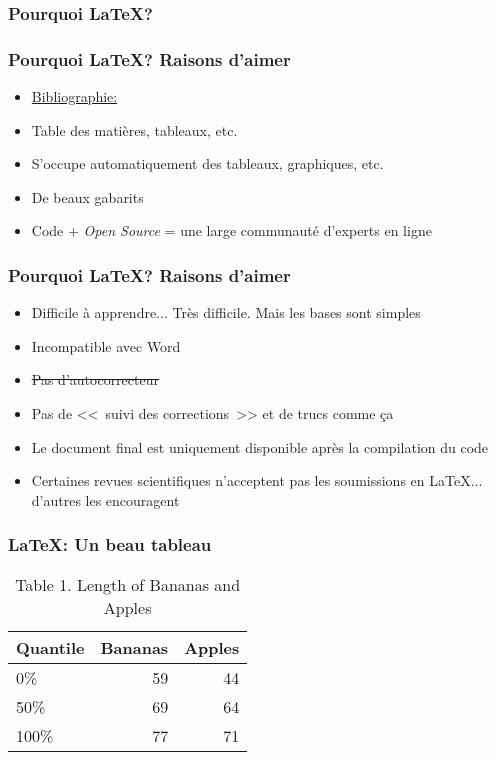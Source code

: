 \documentclass{beamer}
\begin{document}
    \begin{frame}
        \frametitle{Pourquoi \LaTeX?} \vspace{1cm}   
    \end{frame}
    
    \begin{frame}
        \frametitle{Pourquoi \LaTeX? Raisons d'aimer} \vspace{1cm}
        \begin{itemize}
           \item{\href{https://scholar.google.ca}{Bibliographie: \BibTeX}}
           \item{Table des matières, tableaux, etc.}
           \item{S'occupe automatiquement des tableaux, graphiques, etc.}
           \item{De beaux gabarits}
           \item{Code + \emph{Open Source} = une large communauté d'experts en ligne}
        \end{itemize} 
    \end{frame}
    
    \begin{frame}
        \frametitle{Pourquoi \LaTeX? Raisons d'aimer} \vspace{1cm}
        \begin{itemize}
           \item{Difficile à apprendre... Très difficile. Mais les bases sont simples}
           \item{Incompatible avec Word}
           \item{\sout{Pas d'autocorrecteur}}
           \item{Pas de <<~suivi des corrections~>> et de trucs comme ça}
           \item{Le document final est uniquement disponible après la compilation du code}
           \item{Certaines revues scientifiques n'acceptent pas les soumissions en \LaTeX{}... d'autres les encouragent}
        \end{itemize} 
    \end{frame}

    \begin{frame}
        \frametitle{\LaTeX: Un beau tableau} \vspace{1cm}   
            \begin{table}
              \centering
              \normalsize
              \caption{\large{Table 1. Length of Bananas and Apples}}
              \begin{tabular}{lrr}
                  Quantile & Bananas & Apples\\\hline 
                  0\% & 59 & 44\\
                  50\% &69&64\\
                  100\% & 77 & 71\\
              \end{tabular}
              \label{tab:bananespommes}
            \end{table}  
    \end{frame}
    
\end{document}
